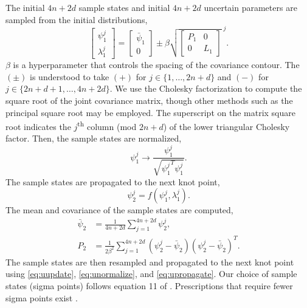 The initial $4n + 2d$ sample states and initial $4n + 2d$
uncertain parameters are sampled from the initial distributions,
\begin{equation}\label{eq:uupdate}
  \begin{bmatrix} \psi_{1}^{j} \\ \lambda_{1}^{j} \end{bmatrix} =
  \begin{bmatrix} \bar{\psi}_{1} \\ 0\end{bmatrix}
    \pm \beta \sqrt{\begin{bmatrix} P_{1} & 0\\ 0 & L_{1}\end{bmatrix}}^{\; j}.
\end{equation}
$\beta$ is a hyperparameter that controls the spacing of the covariance contour.
The $(\pm)$ is understood to take $(+)$ for $j \in \{1, \dots, 2n + d\}$ and $(-)$ for
$j \in \{2n + d + 1, \dots, 4n + 2d\}$. We use the Cholesky factorization
to compute the square root of the
joint covariance matrix, though other methods
such as the principal square root may be employed.
The superscript on the matrix square root indicates the $j$\textsuperscript{th}
column (mod $2n + d$) of the lower triangular Cholesky factor.
Then, the sample states are normalized,
\begin{equation}\label{eq:unormalize}
  \psi_{1}^{j} \rightarrow \frac{\psi_{1}^{j}}{\sqrt{{\psi_{1}^{j}}^{T} \psi_{1}^{j}}}.
\end{equation}
The sample states are propagated to the next knot point,
\begin{equation}\label{eq:upropagate}
  \psi^{j}_{2} = f(\psi^{j}_{1}, \lambda^{j}_{1}).
\end{equation}
The mean and covariance of the sample states are computed,
\begin{align}
  \bar{\psi}_{2} &= \frac{1}{4n + 2d} \sum_{j = 1}^{4n + 2d} \psi_{2}^{j},\\
  P_{2} &= \frac{1}{2 \beta^{2}} \sum_{j = 1}^{4n + 2d}
  (\psi^{j}_{2} - \bar{\psi}_{2})(\psi^{j}_{2} - \bar{\psi}_{2})^{T}.
\end{align}
The sample states are then resampled and propagated to the next knot point using
\eqref{eq:uupdate}, \eqref{eq:unormalize}, and \eqref{eq:upropagate}. Our
choice of sample states (sigma points) follows equation 11 of
\cite{julier2004unscented}.
Prescriptions that require fewer sigma points exist \cite{julier2002reduced}.




